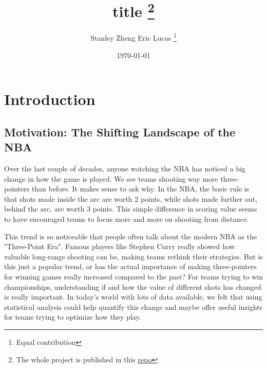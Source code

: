 \documentclass[11pt, a4paper]{article} %
\title{title \thanks{The whole project is published in this \href{https://github.com/S-tanley/STAT-333-UW-Madison}{repo}}} %
\author{
Stanley Zheng \space Eric \space Lucas
    \thanks{Equal contribution} %
  }
\date{\small \today} %
\begin{document}
%

\maketitle %


\setcounter{page}{1} %

\section{Introduction} %

\subsection{Motivation: The Shifting Landscape of the NBA} %
Over the last couple of decades, anyone watching the NBA has noticed a big change in how the game is played. We see teams shooting 
way more three-pointers than before. It makes sense to ask why. In the NBA, the basic rule is that shots made inside the arc are 
worth 2 points, while shots made further out, behind the arc, are worth 3 points. This simple difference in scoring value seems to 
have encouraged teams to focus more and more on shooting from distance.

This trend is so noticeable that people often talk about the modern NBA as the "Three-Point Era". Famous players like Stephen Curry 
really showed how valuable long-range shooting can be, making teams rethink their strategies. But is this just a popular trend, or 
has the actual importance of making three-pointers for winning games really increased compared to the past? For teams trying to win 
championships, understanding if and how the value of different shots has changed is really important. In today's world with lots of 
data available, we felt that using statistical analysis could help quantify this change and maybe offer useful insights for teams 
trying to optimize how they play.
\end{document}
